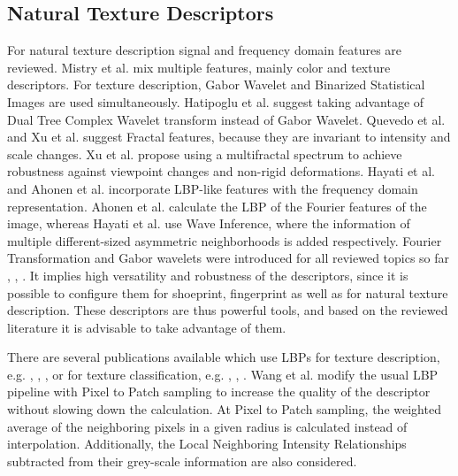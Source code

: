 \documentclass[draft,final]{vutinfth} %
\begin{document}
\subsection{Natural Texture Descriptors}
\par
For natural texture description signal and frequency domain features are reviewed.
Mistry et al. \cite{mistry2017content}  mix multiple features, mainly color and texture descriptors.
For texture description, Gabor Wavelet and Binarized Statistical Images  \cite{kannala2012bsif} are used simultaneously.
Hatipoglu et al. \cite{hatipoglu2000image} suggest taking advantage of Dual Tree Complex Wavelet transform instead of Gabor Wavelet.
Quevedo et al. \cite{quevedo2002description} and Xu et al. \cite{xu2009viewpoint} suggest Fractal features, because they are invariant to intensity and scale changes.
Xu et al. \cite{xu2009viewpoint} propose using a multifractal spectrum to achieve robustness against viewpoint changes and non-rigid deformations.
Hayati et al. \cite{hayati2018wirif} and Ahonen et al. \cite{ahonen2009rotation} incorporate LBP-like features with the frequency domain representation.
Ahonen et al. \cite{ahonen2009rotation} calculate the LBP of the Fourier features of the image, whereas Hayati et al. \cite{hayati2018wirif} use Wave Inference, where the information of multiple different-sized asymmetric neighborhoods is added respectively.
Fourier Transformation and Gabor wavelets were introduced for all reviewed topics so far \cite{kortylewski2014unsupervised}, \cite{wu2019crime}, \cite{bolle2012fingerprint}.
It implies high versatility and robustness of the descriptors, since it is possible to configure them for shoeprint, fingerprint as well as for natural texture description.  
These descriptors are thus powerful tools, and based on the reviewed literature it is advisable to take advantage of them.
\par
There are several publications available which use LBPs for texture description, e.g. \cite{guo2012discriminative}, \cite{hong2014combining}, \cite{ahonen2009rotation}, or for texture classification, e.g. \cite{khellah2011texture}, \cite{guo2010rotation}, \cite{zhang2017learning}.
Wang et al. \cite{wang2013pixel} modify the usual LBP pipeline with Pixel to Patch sampling to increase the quality of the descriptor without slowing down the calculation.
At Pixel to Patch sampling, the weighted average of the neighboring pixels in a given radius is calculated instead of interpolation.
Additionally, the Local Neighboring Intensity Relationships subtracted from their grey-scale information are also considered.
\end{document}
